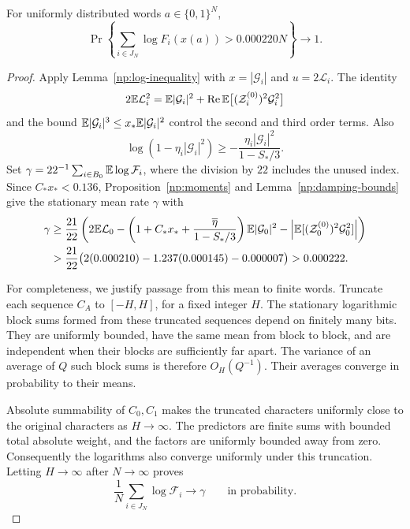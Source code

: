 \begin{proposition}\label{np:typical-gain}
For uniformly distributed words \(a\in\{0,1\}^N\),
\begin{equation}
 \Pr\left\{\sum_{i\in J_N}\log F_i(x(a))>0.000220N\right\}
 \longrightarrow1.
 \label{np:typical-gain-bound}
\end{equation}
\end{proposition}

\begin{proof}
Apply Lemma~\ref{np:log-inequality} with
\(x=|\mathcal G_i|\) and \(u=2\mathcal L_i\). The identity
\[
 2\mathbb E\mathcal L_i^2
 =\mathbb E|\mathcal G_i|^2+
   \operatorname{Re}\mathbb E\bigl[(\mathcal Z_i^{(0)})^2\mathcal G_i^2\bigr]
\]
and the bound \(\mathbb E|\mathcal G_i|^3\le x_*\mathbb E|\mathcal G_i|^2\)
control the second and third order terms. Also
\[
 \log(1-\eta_i|\mathcal G_i|^2)
 \ge-\frac{\eta_i|\mathcal G_i|^2}{1-S_*/3}.
\]
Set \(\gamma=22^{-1}\sum_{i\in B_0}\mathbb E\log\mathcal F_i\), where the
division by \(22\) includes the unused index. Since \(C_*x_*<0.136\),
Proposition~\ref{np:moments} and Lemma~\ref{np:damping-bounds} give the
stationary mean rate \(\gamma\) with
\begin{equation}
 \begin{split}
 \gamma
 &\ge\frac{21}{22}\left(
     2\mathbb E\mathcal L_0
     -\left(1+C_*x_*+\frac{\overline\eta}{1-S_*/3}\right)
            \mathbb E|\mathcal G_0|^2
     -\left|\mathbb E[(\mathcal Z_0^{(0)})^2\mathcal G_0^2]\right|
                       \right)\\
 &>\frac{21}{22}\bigl(2(0.000210)-1.237(0.000145)-0.000007\bigr)
   >0.000222.
 \end{split}
 \label{np:mean-gain}
\end{equation}

For completeness, we justify passage from this mean to finite words.
Truncate each sequence \(C_A\) to \([-H,H]\), for a fixed integer \(H\).
The stationary logarithmic block sums formed from these truncated
sequences depend on finitely many bits. They are uniformly bounded,
have the same mean from block to block, and are independent when their
blocks are sufficiently far apart. The variance of an average of
\(Q\) such block sums is therefore \(O_H(Q^{-1})\). Their averages
converge in probability to their means.

Absolute summability of \(C_0,C_1\) makes the truncated characters
uniformly close to the original characters as \(H\to\infty\).
The predictors are finite sums with bounded total absolute weight, and
the factors are uniformly bounded away from zero. Consequently the
logarithms also converge uniformly under this truncation. Letting
\(H\to\infty\) after \(N\to\infty\) proves
\[
 \frac1N\sum_{i\in J_N}\log\mathcal F_i
   \longrightarrow\gamma\qquad\text{in probability}.
\]


\end{proof}
